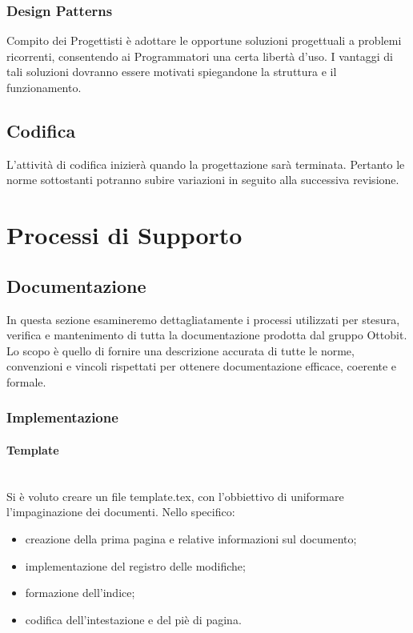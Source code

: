 \documentclass[11pt,a4paper]{article}
\begin{document}
	\subsubsection{Design Patterns} Compito dei Progettisti è adottare le opportune soluzioni progettuali a problemi ricorrenti, consentendo ai Programmatori una certa libertà d'uso. I vantaggi di tali soluzioni dovranno essere motivati spiegandone la struttura e il funzionamento.
	
	\subsection{Codifica}
	L'attività di codifica inizierà quando la progettazione sarà terminata. Pertanto
	le norme sottostanti potranno subire variazioni in seguito alla successiva revisione.

	
	\newpage
	\section{Processi di Supporto}
	
	\subsection{Documentazione}
	In questa sezione esamineremo dettagliatamente i processi utilizzati per stesura, verifica e mantenimento di tutta la documentazione prodotta dal gruppo Ottobit.
	Lo scopo è quello di fornire una descrizione accurata di tutte le norme, convenzioni e vincoli rispettati per ottenere documentazione efficace, coerente e formale.
	\subsubsection{Implementazione}
	
	\paragraph{Template}
	\noindent \\ 
	Si è voluto creare un file template.tex, con l'obbiettivo di uniformare l'impaginazione dei documenti. 
	Nello specifico:
	\begin{itemize}
		\item{creazione della prima pagina e relative informazioni sul documento;}
		\item{implementazione del registro delle modifiche;}
		\item{formazione dell'indice;}
		\item {codifica dell'intestazione e del piè di pagina.}
		
	\end{itemize}
\end{document}
